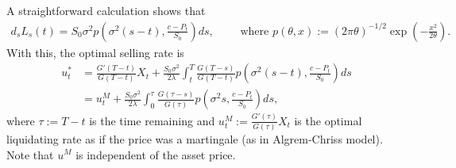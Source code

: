\documentclass[openany,oneside]{article}
\theoremstyle{definition}
\theoremstyle{remark}
\newcommand{\ts}{\textstyle}
\begin{document}
{\color{red}
A straightforward calculation shows that
\begin{align*}
\ts d_s L_s(t) = S_0\sigma^2 p\left(\sigma^2(s-t),\frac{c-P_t}{S_0}\right) ds, \qquad \textrm{ where } p(\theta,x):=(2\pi\theta)^{-1/2}\exp\left(-\frac{x^2}{2\theta}\right).
\end{align*}
With this, the optimal selling rate is
\begin{align*}
u^\ast_t &\ts= \frac{G'(T-t)}{G(T-t)}X_t + \frac{S_0\sigma^2}{2\lambda}\int_t^T \frac{G(T-s)}{G(T-t)}p\left(\sigma^2(s-t),\frac{c-P_t}{S_0}\right) ds \\
&\ts = u^M_t + \frac{S_0\sigma^2}{2\lambda}\int_0^\tau \frac{G(\tau-s)}{G(\tau)}p\left(\sigma^2 s, \frac{c-P_t}{S_0}\right) ds,
\end{align*}
where $\tau:=T-t$ is the time remaining and $u^M_t:=\frac{G'(\tau)}{G(\tau)}X_t$ is the optimal liquidating rate as if the price was a martingale (as in Algrem-Chriss model). Note that $u^M$ is independent of the asset price.
}
\end{document}
